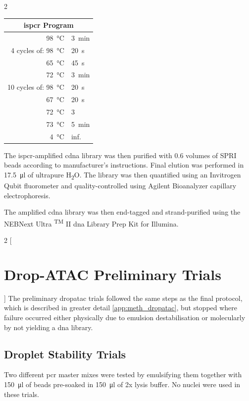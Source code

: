\begin{appendix}
\begin{multicols}{2}
\begin{center}
\begin{tabular}{r|l}
	\multicolumn{2}{c}{\acrshort{ispcr} Program} \\
	\hline
	\SI{98}{\celsius} & \SI{3}{\minute} \\
	\hline
	4 cycles of: \SI{98}{\celsius} & \SI{20}{\second} \\
	\SI{65}{\celsius} & \SI{45}{\second} \\
	\SI{72}{\celsius} & \SI{3}{\minute} \\
	\hline
	10 cycles of: \SI{98}{\celsius} & \SI{20}{\second} \\
	\SI{67}{\celsius} & \SI{20}{\second} \\
	\SI{72}{\celsius} & \SI{3}{\min} \\
	\hline
	\SI{73}{\celsius} & \SI{5}{\minute} \\
	\SI{4}{\celsius} & inf. \\
\end{tabular}
\end{center}
\medskip

The \acrshort{ispcr}-amplified \acrshort{cdna} library was then purified with 0.6 volumes of SPRI beads according to manufacturer's instructions. Final elution was performed in \SI{17.5}{\ul} of ultrapure H\textsubscript{2}O. The library was then quantified using an Invitrogen Qubit fluorometer and quality-controlled using Agilent Bioanalyzer capillary electrophoresis.\pms

The amplified \acrshort{cdna} library was then end-tagged and strand-purified using the NEBNext Ultra \textsuperscript{TM} II \acrshort{dna} Library Prep Kit for Illumina.\pms

\end{multicols}

\newpage
\begin{multicols}{2}
[\section{Drop-ATAC Preliminary Trials}\label{app:meth_dropatac_opt}]
The preliminary \acrshort{dropatac} trials followed the same steps as the final protocol, which is described in greater detail \ref{app:meth_dropatac}, but stopped where failure occurred either physically due to emulsion destabilisation or molecularly by not yielding a \acrshort{dna} library.\pms

\subsection{Droplet Stability Trials}
Two different \acrshort{pcr} master mixes were tested by emulsifying them together with \SI{150}{\ul} of beads pre-soaked in \SI{150}{\ul} of 2x lysis buffer. No nuclei were used in these trials.\pms


\end{multicols}
\end{appendix}
